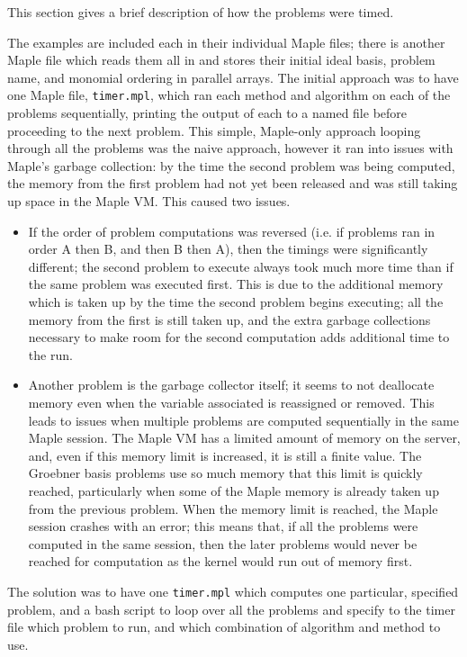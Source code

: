 \documentclass[letterpaper,12pt,titlepage,oneside,final]{book}
\begin{document}
\begin{appendices}
This section gives a brief description of how the problems were timed.

The examples are included each in their individual Maple files; there is another Maple file which reads them all in and stores their initial ideal basis, problem name, and monomial ordering in parallel arrays.  The initial approach was to have one Maple file, \texttt{timer.mpl}, which ran each method and algorithm on each of the problems sequentially, printing the output of each to a named file before proceeding to the next problem.  This simple, Maple-only approach looping through all the problems was the naive approach, however it ran into issues with Maple's garbage collection: by the time the second problem was being computed, the memory from the first problem had not yet been released and was still taking up space in the Maple VM.  This caused two issues.
\begin{itemize}
  \item If the order of problem computations was reversed (i.e. if problems ran in order A then B, and then B then A), then the timings were significantly different; the second problem to execute always took much more time than if the same problem was executed first.  This is due to the additional memory which is taken up by the time the second problem begins executing; all the memory from the first is still taken up, and the extra garbage collections necessary to make room for the second computation adds additional time to the run.
  \item Another problem is the garbage collector itself; it seems to not deallocate memory even when the variable associated is reassigned or removed.  This leads to issues when multiple problems are computed sequentially in the same Maple session.  The Maple VM has a limited amount of memory on the server, and, even if this memory limit is increased, it is still a finite value.  The Groebner basis problems use so much memory that this limit is quickly reached, particularly when some of the Maple memory is already taken up from the previous problem.  When the memory limit is reached, the Maple session crashes with an error; this means that, if all the problems were computed in the same session, then the later problems would never be reached for computation as the kernel would run out of memory first.  
\end{itemize} 
The solution was to have one \texttt{timer.mpl} which computes one particular, specified problem, and a bash script to loop over all the problems and specify to the timer file which problem to run, and which combination of algorithm and method to use.


\end{appendices}
\end{document}
